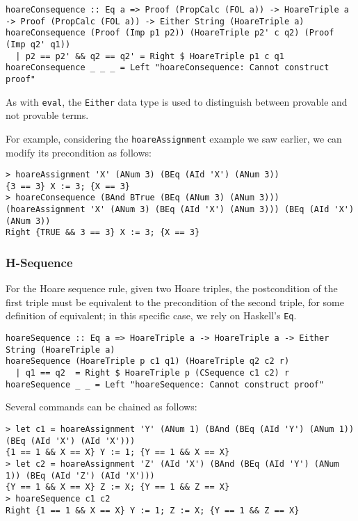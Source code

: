 \documentclass{article}
\begin{document}
\begin{lstlisting}
hoareConsequence :: Eq a => Proof (PropCalc (FOL a)) -> HoareTriple a -> Proof (PropCalc (FOL a)) -> Either String (HoareTriple a)
hoareConsequence (Proof (Imp p1 p2)) (HoareTriple p2' c q2) (Proof (Imp q2' q1))
  | p2 == p2' && q2 == q2' = Right $ HoareTriple p1 c q1
hoareConsequence _ _ _ = Left "hoareConsequence: Cannot construct proof"
\end{lstlisting}

As with \texttt{eval}, the \texttt{Either} data type is used to distinguish between provable and not provable terms.

For example, considering the \texttt{hoareAssignment} example we saw earlier, we can modify its precondition as follows:

\begin{lstlisting}
> hoareAssignment 'X' (ANum 3) (BEq (AId 'X') (ANum 3))
{3 == 3} X := 3; {X == 3}
> hoareConsequence (BAnd BTrue (BEq (ANum 3) (ANum 3))) (hoareAssignment 'X' (ANum 3) (BEq (AId 'X') (ANum 3))) (BEq (AId 'X') (ANum 3))
Right {TRUE && 3 == 3} X := 3; {X == 3}
\end{lstlisting}

\subsubsection{H-Sequence}

For the Hoare sequence rule, given two Hoare triples, the postcondition of the first triple must be equivalent to the precondition of the second triple, for some definition of equivalent; in this specific case, we rely on Haskell's \texttt{Eq}.

\begin{lstlisting}
hoareSequence :: Eq a => HoareTriple a -> HoareTriple a -> Either String (HoareTriple a)
hoareSequence (HoareTriple p c1 q1) (HoareTriple q2 c2 r)
  | q1 == q2  = Right $ HoareTriple p (CSequence c1 c2) r
hoareSequence _ _ = Left "hoareSequence: Cannot construct proof"
\end{lstlisting}

Several commands can be chained as follows:

\begin{lstlisting}
> let c1 = hoareAssignment 'Y' (ANum 1) (BAnd (BEq (AId 'Y') (ANum 1)) (BEq (AId 'X') (AId 'X')))
{1 == 1 && X == X} Y := 1; {Y == 1 && X == X}
> let c2 = hoareAssignment 'Z' (AId 'X') (BAnd (BEq (AId 'Y') (ANum 1)) (BEq (AId 'Z') (AId 'X')))
{Y == 1 && X == X} Z := X; {Y == 1 && Z == X}
> hoareSequence c1 c2
Right {1 == 1 && X == X} Y := 1; Z := X; {Y == 1 && Z == X}
\end{lstlisting}
\end{document}
